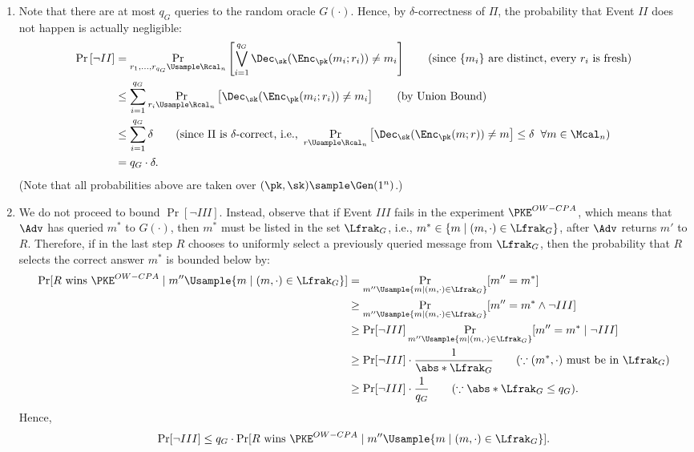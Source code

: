 \begin{answer}[i]
\begin{enumerate}
        \item Note that there are at most $q_G$ queries to the random oracle $G(\cdot)$. Hence, by $\delta$-correctness of $\Pi$, the probability that Event $II$ does not happen is actually negligible:
        \begin{align}\label{eq:p2-1-3}
            \Pr\left[\neg II \right]
            &= \Pr_{r_1,\ldots,r_{q_G}\Usample \Rcal_n}\left[\bigvee_{i=1}^{q_G}   \Dec_\sk(\Enc_\pk(m_i; r_i))\neq m_i\right]
            \qquad (\textrm{since $\{m_i\}$ are distinct, every $r_i$ is fresh})\notag\\
            &\le \sum_{i=1}^{q_G} \Pr_{r_i\Usample \Rcal_n}\left[\Dec_\sk(\Enc_\pk(m_i; r_i))\neq m_i\right]
            \qquad (\textrm{by Union Bound})\notag\\
            &\le \sum_{i=1}^{q_G} \delta 
            \qquad (\textrm{since } \Pi \textrm{ is }\delta\textrm{-correct, i.e., } 
            \Pr_{r\Usample\Rcal_n}\left[\Dec_\sk(\Enc_\pk(m;r)) \neq  m\right]\le \delta\;\;\forall m\in\Mcal_n)\notag\\
            &= q_G\cdot \delta.
        \end{align}
        (Note that all probabilities above are taken over $(\pk, \sk)\sample\Gen(1^n)$.)
        
        \item We do not proceed to bound $\Pr[\neg III]$. Instead, observe that if Event $III$ fails in the experiment $\PKE^{OW-CPA}$, which means that $\Adv$ has queried $m^\ast$ to $G(\cdot)$, then $m^\ast$ must be listed in the set $\Lfrak_G$, i.e., $m^\ast \in \{m\mid (m, \cdot)\in\Lfrak_G\}$, after $\Adv$ returns $m'$ to $R$. Therefore, if in the last step $R$ chooses to uniformly select a previously queried message from $\Lfrak_G$, then the probability that $R$ selects the correct answer $m^\ast$ is bounded below by:
        \begin{align*}
            \Pr[R\textrm{ wins } \PKE^{OW-CPA} \mid m'' \Usample \{m\mid (m, \cdot)\in\Lfrak_G\}]
            &= \Pr_{m'' \Usample \{m\mid (m, \cdot)\in\Lfrak_G\}}[m''=m^\ast]\\
            &\ge \Pr_{m'' \Usample \{m\mid (m, \cdot)\in\Lfrak_G\}}[m''=m^\ast \land \neg III]\\
            &\ge \Pr[\neg III]\Pr_{m'' \Usample \{m\mid (m, \cdot)\in\Lfrak_G\}}[m''=m^\ast \mid  \neg  III]\\
            &\ge \Pr[\neg III]\cdot \frac{1}{\abs*{\Lfrak_G}} \qquad (\because (m^\ast,\cdot) \textrm{ must be in } \Lfrak_G)\\
            &\ge \Pr[\neg III]\cdot \frac{1}{q_G} \qquad (\because \abs*{\Lfrak_G}\le q_G).
        \end{align*}
        Hence,
        \begin{equation}\label{eq:p2-1-4}
            \Pr[\neg III]\le q_G\cdot \Pr[R\textrm{ wins } \PKE^{OW-CPA} \mid m'' \Usample \{m\mid (m, \cdot)\in\Lfrak_G\}].
        \end{equation}
    \end{enumerate}


\end{answer}
